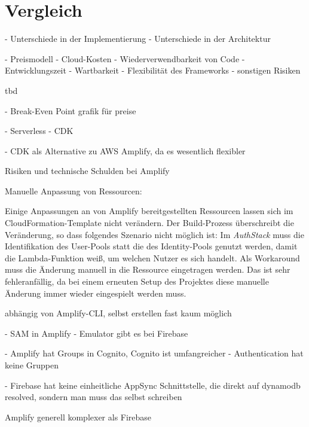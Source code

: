 \chapter{Vergleich}

- Unterschiede in der Implementierung
- Unterschiede in der Architektur

- Preismodell
- Cloud-Kosten
- Wiederverwendbarkeit von Code
- Entwicklungszeit
- Wartbarkeit
- Flexibilität des Frameworks
- sonstigen Risiken

tbd

- Break-Even Point grafik für preise

- Serverless
- CDK

- CDK als Alternative zu AWS Amplify, da es wesentlich flexibler

Risiken und technische Schulden bei Amplify

Manuelle Anpassung von Ressourcen:

Einige Anpassungen an von Amplify bereitgestellten Ressourcen lassen sich im CloudFormation-Template nicht verändern. Der Build-Prozess überschreibt die Veränderung, so dass folgendes Szenario nicht möglich ist: Im \textit{AuthStack} muss die Identifikation des User-Pools statt die des Identity-Pools genutzt werden, damit die Lambda-Funktion weiß, um welchen Nutzer es sich handelt. Als Workaround muss die Änderung manuell in die Ressource eingetragen werden. Das ist sehr fehleranfällig, da bei einem erneuten Setup des Projektes diese manuelle Änderung immer wieder eingespielt werden muss.

abhängig von Amplify-CLI, selbst erstellen fast kaum möglich


- SAM in Amplify
- Emulator gibt es bei Firebase

- Amplify hat Groups in Cognito, Cognito ist umfangreicher
- Authentication hat keine Gruppen

- Firebase hat keine einheitliche AppSync Schnittstelle, die direkt auf dynamodb resolved, sondern man muss das selbst schreiben

Amplify generell komplexer als Firebase